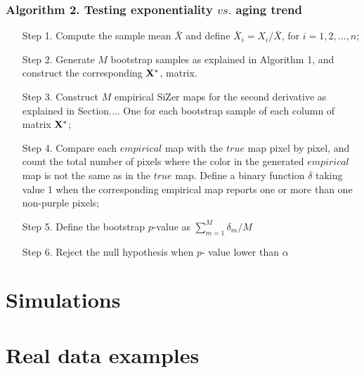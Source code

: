 \documentclass[preprint,12pt]{elsarticle}
\begin{document}
\subsubsection*{Algorithm 2. Testing exponentiality $vs.$  aging trend} 
\begin{enumerate}
\item[Step 1.] Compute the sample mean $\bar{X}$ and define $\bar{X}_i=X_i/\bar{X}$, for $ i=1,2,\ldots,n$;
\item[Step 2.] Generate  $M$ bootstrap samples as explained in Algorithm 1, and construct the corresponding ${\bf X}^*$, matrix. 
\item[Step 3.] Construct $M$ empirical SiZer maps for the second derivative as explained in Section.... One for each bootstrap sample of each column of matrix ${\bf X}^*$;
\item[Step 4.] Compare each $empirical$ map with the $true$ map pixel by pixel, and count the total number of pixels where the color in the generated $empirical$ map is not the same as in the $true$ map. Define a binary function $\delta$ taking value 1 when the corresponding empirical map reports one or more than one non-purple pixels;
\item[Step 5.] Define the bootstrap $p$-value as $\sum_{m=1}^M \delta_m /M$
\item[Step 6.] Reject the null hypothesis when $p$- value lower than $\alpha$
\end{enumerate}
\newpage

\section{Simulations}

\section{Real data examples}
\end{document}
